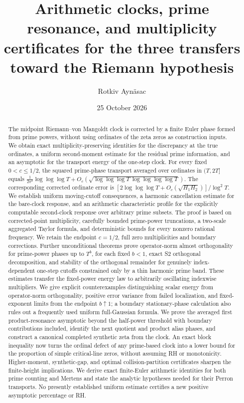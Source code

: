 \documentclass[11pt,reqno]{amsart}
\title[Arithmetic clock, multiplicity and RH transfers]{Arithmetic clocks, prime resonance, and multiplicity certificates for the three transfers toward the Riemann hypothesis}
\author{Rotkiv Ayn\"asac}
\date{25 October 2026}
\numberwithin{equation}{section}
\begin{document}
\begin{abstract}
The midpoint Riemann--von Mangoldt clock is corrected by a finite Euler phase formed from prime powers, without using ordinates of the zeta zeros as construction inputs. We obtain exact multiplicity-preserving identities for the discrepancy at the true ordinates, a uniform second-moment estimate for the residual prime information, and an asymptotic for the transport energy of the one-step clock. For every fixed $0<c\le1/2$, the squared prime-phase transport averaged over ordinates in $(T,2T]$ equals $\frac1{2\pi^2}\log\log\log T+O_c(\sqrt{\log\log\log T\,\log\log\log\log T})$. The corresponding corrected ordinate error is $[2\log\log\log T+O_c(\sqrt{H_1H_2})]/\log^2T$. We establish uniform moving-cutoff consequences, a harmonic cancellation estimate for the bare-clock response, and an arithmetic characteristic profile for the explicitly computable second-clock response over arbitrary prime subsets. The proof is based on corrected-point multiplicity, carefully bounded prime-power truncations, a two-scale aggregated Taylor formula, and deterministic bounds for every nonzero rational frequency. We retain the endpoint $c=1/2$, full zero multiplicities and boundary corrections. Further unconditional theorems prove operator-norm almost orthogonality for prime-power phases up to $T^b$, for each fixed $b<1$, exact S2 orthogonal decomposition, and stability of the orthogonal remainder for genuinely index-dependent one-step cutoffs constrained only by a thin harmonic prime band. These estimates transfer the fixed-power energy law to arbitrarily oscillating indexwise multipliers. We give explicit counterexamples distinguishing scalar energy from operator-norm orthogonality, positive error variance from failed localization, and fixed-exponent limits from the endpoint $b\uparrow1$; a boundary stationary-phase calculation also rules out a frequently used uniform full-Gaussian formula. We prove the averaged first product-resonance asymptotic beyond the half-power threshold with boundary contributions included, identify the next quotient and product alias phases, and construct a canonical completed synthetic zeta from the clock. An exact block inequality now turns the ordinal defect of any prime-based clock into a lower bound for the proportion of simple critical-line zeros, without assuming RH or monotonicity. Higher-moment, synthetic-gap, and optimal collision-partition certificates sharpen the finite-height implications. We derive exact finite-Euler arithmetic identities for both prime counting and Mertens and state the analytic hypotheses needed for their Perron transports. No presently established uniform estimate certifies a new positive asymptotic percentage or RH.
\end{abstract}
\maketitle
\tableofcontents
\end{document}
